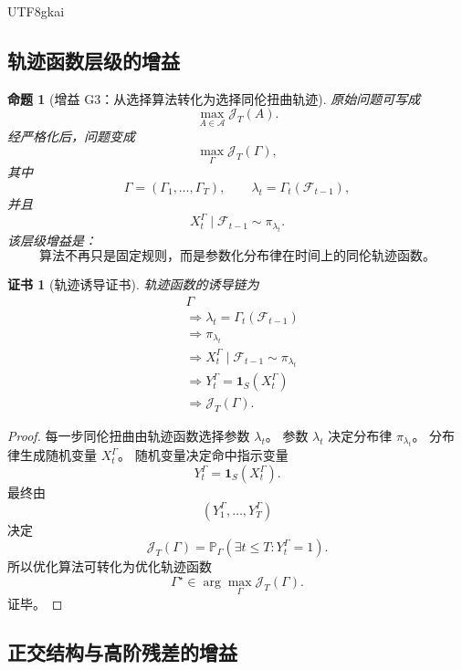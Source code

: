 \documentclass[12pt]{article}
\newtheorem{proposition}{命题}[section]
\newtheorem{Certificate}{证书}[section]
\begin{document}
\begin{CJK*}{UTF8}{gkai}
\subsection{轨迹函数层级的增益}
\label{subsec:tex55-gain-trajectory-level}

\begin{proposition}[增益 G3：从选择算法转化为选择同伦扭曲轨迹]
\label{prop:tex55-gain-trajectory-selection}
原始问题可写成
\[
  \max_{A\in\mathcal A}\mathcal J_T(A).
\]
经严格化后，问题变成
\[
  \max_{\Gamma}\mathcal J_T(\Gamma),
\]
其中
\[
  \Gamma=(\Gamma_1,\ldots,\Gamma_T),
  \qquad
  \lambda_t=\Gamma_t(\mathcal F_{t-1}),
\]
并且
\[
  X_t^\Gamma\mid\mathcal F_{t-1}\sim\pi_{\lambda_t}.
\]
该层级增益是：
\[
  \boxed{
  \text{算法不再只是固定规则，而是参数化分布律在时间上的同伦轨迹函数。}
  }
\]
\end{proposition}

\begin{Certificate}[轨迹诱导证书]
\label{cert:tex55-gain-trajectory-selection}
轨迹函数的诱导链为
\[
\begin{aligned}
  &\Gamma\\
  &\Longrightarrow
  \lambda_t=\Gamma_t(\mathcal F_{t-1})\\
  &\Longrightarrow
  \pi_{\lambda_t}\\
  &\Longrightarrow
  X_t^\Gamma\mid\mathcal F_{t-1}\sim\pi_{\lambda_t}\\
  &\Longrightarrow
  Y_t^\Gamma=\mathbf 1_S(X_t^\Gamma)\\
  &\Longrightarrow
  \mathcal J_T(\Gamma).
\end{aligned}
\]
\end{Certificate}

\begin{proof}
每一步同伦扭曲由轨迹函数选择参数 \(\lambda_t\)。
参数 \(\lambda_t\) 决定分布律 \(\pi_{\lambda_t}\)。
分布律生成随机变量 \(X_t^\Gamma\)。
随机变量决定命中指示变量
\[
  Y_t^\Gamma=\mathbf 1_S(X_t^\Gamma).
\]
最终由
\[
  (Y_1^\Gamma,\ldots,Y_T^\Gamma)
\]
决定
\[
  \mathcal J_T(\Gamma)
  =
  \mathbb P_\Gamma(\exists t\le T:Y_t^\Gamma=1).
\]
所以优化算法可转化为优化轨迹函数
\[
  \Gamma^\star\in\arg\max_\Gamma\mathcal J_T(\Gamma).
\]
证毕。
\end{proof}

\subsection{正交结构与高阶残差的增益}
\label{subsec:tex55-gain-orthogonal-level}


\end{CJK*}
\end{document}
